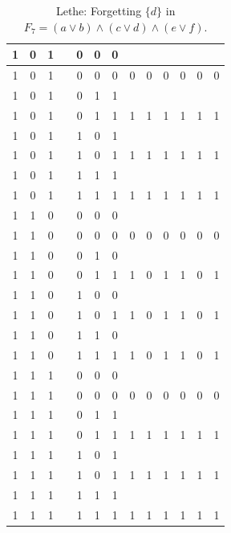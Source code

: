 \begin{table}[!tb]
\begin{tabular}{|c|c|c|c|c|c|c|c|c|c|c|c|c|}
        \rowcolor{gray!40} 1 & 0 & 1 &  & 0 & 0 & 0 &  &  &  &  &  &  \\ \hline
        \rowcolor{gray!40} 1 & 0 & 1 &  & 0 & 0 & 0 & 0 & 0 & 0 & 0 & 0 & 0 \\ \hline
        \rowcolor{blue!40} 1 & 0 & 1 &  & 0 & 1 & 1 &  &  &  &  &  &  \\ \hline
        \rowcolor{blue!40} 1 & 0 & 1 &  & 0 & 1 & 1 & 1 & 1 & 1 & 1 & 1 & 1 \\ \hline
        \rowcolor{red!40} 1 & 0 & 1 &  & 1 & 0 & 1 &  &  &  &  &  &  \\ \hline
        \rowcolor{red!40} 1 & 0 & 1 &  & 1 & 0 & 1 & 1 & 1 & 1 & 1 & 1 & 1 \\ \hline
        \rowcolor{green!40} 1 & 0 & 1 &  & 1 & 1 & 1 &  &  &  &  &  &  \\ \hline
        \rowcolor{green!40} 1 & 0 & 1 &  & 1 & 1 & 1 & 1 & 1 & 1 & 1 & 1 & 1 \\ \hline
        \rowcolor{yellow!40} 1 & 1 & 0 &  & 0 & 0 & 0 &  &  &  &  &  &  \\ \hline
        \rowcolor{yellow!40} 1 & 1 & 0 &  & 0 & 0 & 0 & 0 & 0 & 0 & 0 & 0 & 0 \\ \hline
        \rowcolor{gray!40} 1 & 1 & 0 &  & 0 & 1 & 0 &  &  &  &  &  &  \\ \hline
        \rowcolor{gray!40} 1 & 1 & 0 &  & 0 & 1 & 1 & 1 & 0 & 1 & 1 & 0 & 1 \\ \hline
        \rowcolor{blue!40} 1 & 1 & 0 &  & 1 & 0 & 0 &  &  &  &  &  &  \\ \hline
        \rowcolor{blue!40} 1 & 1 & 0 &  & 1 & 0 & 1 & 1 & 0 & 1 & 1 & 0 & 1 \\ \hline
        \rowcolor{red!40} 1 & 1 & 0 &  & 1 & 1 & 0 &  &  &  &  &  &  \\ \hline
        \rowcolor{red!40} 1 & 1 & 0 &  & 1 & 1 & 1 & 1 & 0 & 1 & 1 & 0 & 1 \\ \hline
        \rowcolor{green!40} 1 & 1 & 1 &  & 0 & 0 & 0 &  &  &  &  &  &  \\ \hline
        \rowcolor{green!40} 1 & 1 & 1 &  & 0 & 0 & 0 & 0 & 0 & 0 & 0 & 0 & 0 \\ \hline
        \rowcolor{yellow!40} 1 & 1 & 1 &  & 0 & 1 & 1 &  &  &  &  &  &  \\ \hline
        \rowcolor{yellow!40} 1 & 1 & 1 &  & 0 & 1 & 1 & 1 & 1 & 1 & 1 & 1 & 1 \\ \hline
        \rowcolor{gray!40} 1 & 1 & 1 &  & 1 & 0 & 1 &  &  &  &  &  &  \\ \hline
        \rowcolor{gray!40} 1 & 1 & 1 &  & 1 & 0 & 1 & 1 & 1 & 1 & 1 & 1 & 1 \\ \hline
        \rowcolor{blue!40} 1 & 1 & 1 &  & 1 & 1 & 1 &  &  &  &  &  &  \\ \hline
        \rowcolor{blue!40} 1 & 1 & 1 &  & 1 & 1 & 1 & 1 & 1 & 1 & 1 & 1 & 1 \\ \hline
    \end{tabular}
    \caption{Lethe: Forgetting $\{d\}$ in $F_{7} = (a \lor b) \land (c \lor d) \land (e \lor f)$.}
    \label{tab:lethe-F7-d}
\end{table}
